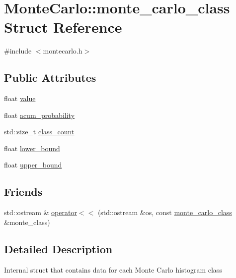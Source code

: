 \hypertarget{structMonteCarlo_1_1monte__carlo__class}{}\section{Monte\+Carlo\+:\+:monte\+\_\+carlo\+\_\+class Struct Reference}
\label{structMonteCarlo_1_1monte__carlo__class}


{\ttfamily \#include $<$montecarlo.\+h$>$}

\subsection*{Public Attributes}
\begin{DoxyCompactItemize}
\item 
float \hyperlink{structMonteCarlo_1_1monte__carlo__class_a0c7e4c55c0c50edb28b278f25505d08a}{value}
\item 
float \hyperlink{structMonteCarlo_1_1monte__carlo__class_a041916db9df0075817d83e7d2298141f}{acum\+\_\+probability}
\item 
std\+::size\+\_\+t \hyperlink{structMonteCarlo_1_1monte__carlo__class_aeb1efb33c2cd66ae700593af43ab9339}{class\+\_\+count}
\item 
float \hyperlink{structMonteCarlo_1_1monte__carlo__class_a3d56f6bfce662896178530b5899966cf}{lower\+\_\+bound}
\item 
float \hyperlink{structMonteCarlo_1_1monte__carlo__class_a7a0feeb383189e39013edfd3d2a871a0}{upper\+\_\+bound}
\end{DoxyCompactItemize}
\subsection*{Friends}
\begin{DoxyCompactItemize}
\item 
std\+::ostream \& \hyperlink{structMonteCarlo_1_1monte__carlo__class_a24eb0421cd0a0c30fa7b97ca39b4bf09}{operator$<$$<$} (std\+::ostream \&os, const \hyperlink{structMonteCarlo_1_1monte__carlo__class}{monte\+\_\+carlo\+\_\+class} \&monte\+\_\+class)
\end{DoxyCompactItemize}


\subsection{Detailed Description}
Internal struct that contains data for each Monte Carlo histogram class 


